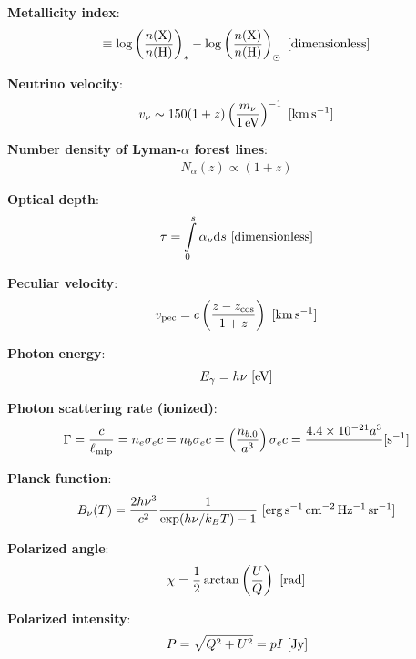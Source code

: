 \documentclass[a4paper,11pt]{article}
\begin{document}
{\noindent}\textbf{Metallicity index}:
\begin{align*}
    [\mathrm{X}/\mathrm{H}] \equiv \log\left(\frac{n(\mathrm{X})}{n(\mathrm{H})}\right)_* -\log\left(\frac{n(\mathrm{X})}{n(\mathrm{H})}\right)_\odot ~ [{\rm dimensionless}]
\end{align*}

{\noindent}\textbf{Neutrino velocity}:
\begin{align*}
    v_\nu \sim 150(1+z)\left(\frac{m_\nu}{1\,{\rm eV}}\right)^{-1} ~ [{\rm km\,s^{-1}}]
\end{align*}

{\noindent}\textbf{Number density of Lyman-$\alpha$ forest lines}:
\begin{align*}
    N_\alpha(z) \propto (1+z)
\end{align*}

{\noindent}\textbf{Optical depth}:
\begin{align*}
    \tau = \int\limits_0^s \alpha_\nu\mathrm{d}s ~ [{\rm dimensionless}]
\end{align*}

{\noindent}\textbf{Peculiar velocity}:
\begin{align*}
    v_{\rm pec} = c\left(\frac{z-z_\mathrm{cos}}{1+z}\right) ~ [{\rm km\,s^{-1}}]
\end{align*}

{\noindent}\textbf{Photon energy}:
\begin{align*}
    E_\gamma = h\nu ~ [{\rm eV}]
\end{align*}

{\noindent}\textbf{Photon scattering rate (ionized)}:
\begin{align*}
    \Gamma = \dfrac{c}{\ell_\mathrm{mfp}} = n_e\sigma_ec = n_b\sigma_ec = \left(\dfrac{n_{b,0}}{a^3}\right)\sigma_ec = \dfrac{4.4\times10^{-21}{a^3}} ~ [{\rm s^{-1}}]
\end{align*}

{\noindent}\textbf{Planck function}:
\begin{align*}
    B_\nu(T) = \frac{2h\nu^3 }{c^2} \frac{1}{\exp(h\nu/k_BT) - 1} ~ [{\rm erg\,s^{-1}\,cm^{-2}\,Hz^{-1}\,sr^{-1}}]
\end{align*}

{\noindent}\textbf{Polarized angle}:
\begin{align*}
    \chi = \frac{1}{2}\arctan\left(\frac{U}{Q}\right) ~ [{\rm rad}]
\end{align*}

{\noindent}\textbf{Polarized intensity}:
\begin{align*}
    P = \sqrt{Q^2 + U^2} = pI ~ [{\rm Jy}]
\end{align*}
\end{document}
